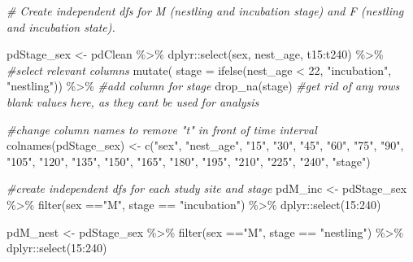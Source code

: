 \documentclass[
]{article}
\newenvironment{Shaded}{\begin{snugshade}}{\end{snugshade}}
\newcommand{\AttributeTok}[1]{\textcolor[rgb]{0.77,0.63,0.00}{#1}}
\newcommand{\CommentTok}[1]{\textcolor[rgb]{0.56,0.35,0.01}{\textit{#1}}}
\newcommand{\DecValTok}[1]{\textcolor[rgb]{0.00,0.00,0.81}{#1}}
\newcommand{\FunctionTok}[1]{\textcolor[rgb]{0.00,0.00,0.00}{#1}}
\newcommand{\NormalTok}[1]{#1}
\newcommand{\OtherTok}[1]{\textcolor[rgb]{0.56,0.35,0.01}{#1}}
\newcommand{\SpecialCharTok}[1]{\textcolor[rgb]{0.00,0.00,0.00}{#1}}
\newcommand{\StringTok}[1]{\textcolor[rgb]{0.31,0.60,0.02}{#1}}
\begin{document}
\begin{Shaded}
\begin{Highlighting}[]
\CommentTok{\# Create independent dfs for M (nestling and incubation stage) and F (nestling and incubation state). }

\NormalTok{pdStage\_sex }\OtherTok{\textless{}{-}}\NormalTok{ pdClean }\SpecialCharTok{\%\textgreater{}\%}
\NormalTok{  dplyr}\SpecialCharTok{::}\FunctionTok{select}\NormalTok{(sex, nest\_age, t15}\SpecialCharTok{:}\NormalTok{t240) }\SpecialCharTok{\%\textgreater{}\%} \CommentTok{\#select relevant columns}
  \FunctionTok{mutate}\NormalTok{(}
    \AttributeTok{stage =}
      \FunctionTok{ifelse}\NormalTok{(nest\_age }\SpecialCharTok{\textless{}} \DecValTok{22}\NormalTok{, }\StringTok{"incubation"}\NormalTok{, }\StringTok{"nestling"}\NormalTok{)) }\SpecialCharTok{\%\textgreater{}\%} \CommentTok{\#add column for \textquotesingle{}stage\textquotesingle{}}
  \FunctionTok{drop\_na}\NormalTok{(stage) }\CommentTok{\#get rid of any rows blank values here, as they can\textquotesingle{}t be used for analysis}
  
\CommentTok{\#change column names to remove "t" in front of time interval}
\FunctionTok{colnames}\NormalTok{(pdStage\_sex) }\OtherTok{\textless{}{-}} \FunctionTok{c}\NormalTok{(}\StringTok{"sex"}\NormalTok{, }\StringTok{"nest\_age"}\NormalTok{, }\StringTok{"15"}\NormalTok{, }\StringTok{"30"}\NormalTok{, }\StringTok{"45"}\NormalTok{, }\StringTok{"60"}\NormalTok{, }\StringTok{"75"}\NormalTok{, }\StringTok{"90"}\NormalTok{, }\StringTok{"105"}\NormalTok{, }\StringTok{"120"}\NormalTok{, }\StringTok{"135"}\NormalTok{, }\StringTok{"150"}\NormalTok{, }\StringTok{"165"}\NormalTok{, }\StringTok{"180"}\NormalTok{, }\StringTok{"195"}\NormalTok{, }\StringTok{"210"}\NormalTok{, }\StringTok{"225"}\NormalTok{, }\StringTok{"240"}\NormalTok{, }\StringTok{"stage"}\NormalTok{)}

\CommentTok{\#create independent dfs for each study site and stage}
\NormalTok{pdM\_inc }\OtherTok{\textless{}{-}}\NormalTok{ pdStage\_sex }\SpecialCharTok{\%\textgreater{}\%}
  \FunctionTok{filter}\NormalTok{(sex }\SpecialCharTok{==}\StringTok{"M"}\NormalTok{, stage }\SpecialCharTok{==} \StringTok{"incubation"}\NormalTok{) }\SpecialCharTok{\%\textgreater{}\%}
\NormalTok{  dplyr}\SpecialCharTok{::}\FunctionTok{select}\NormalTok{(}\StringTok{\textquotesingle{}15\textquotesingle{}}\SpecialCharTok{:}\StringTok{\textquotesingle{}240\textquotesingle{}}\NormalTok{)}

\NormalTok{pdM\_nest }\OtherTok{\textless{}{-}}\NormalTok{ pdStage\_sex }\SpecialCharTok{\%\textgreater{}\%} 
  \FunctionTok{filter}\NormalTok{(sex }\SpecialCharTok{==}\StringTok{"M"}\NormalTok{, stage }\SpecialCharTok{==} \StringTok{"nestling"}\NormalTok{) }\SpecialCharTok{\%\textgreater{}\%}
\NormalTok{  dplyr}\SpecialCharTok{::}\FunctionTok{select}\NormalTok{(}\StringTok{\textquotesingle{}15\textquotesingle{}}\SpecialCharTok{:}\StringTok{\textquotesingle{}240\textquotesingle{}}\NormalTok{)}


\end{Highlighting}
\end{Shaded}
\end{document}
